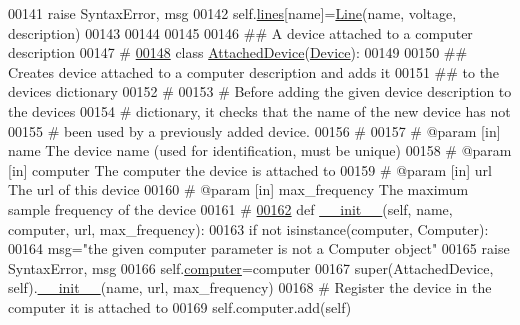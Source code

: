 \begin{DoxyCode}
00141             \textcolor{keywordflow}{raise} SyntaxError, msg
00142         self.\hyperlink{classsettings__classes_1_1_device_a22ea78f101680108434cb132f12afa0a}{lines}[name]=\hyperlink{classsettings__classes_1_1_line}{Line}(name, voltage, description)
00143 
00144 
00145 
00146 \textcolor{comment}{## A device attached to a computer description}
00147 \textcolor{comment}{#}
\hypertarget{settings__classes_8py_source_l00148}{}\hyperlink{classsettings__classes_1_1_attached_device}{00148} \textcolor{keyword}{class }\hyperlink{classsettings__classes_1_1_attached_device}{AttachedDevice}(\hyperlink{classsettings__classes_1_1_device}{Device}):
00149     
00150     \textcolor{comment}{## Creates device attached to a computer description and adds it}
00151     \textcolor{comment}{## to the devices dictionary}
00152     \textcolor{comment}{#}
00153     \textcolor{comment}{#  Before adding the given device description to the devices}
00154     \textcolor{comment}{#  dictionary, it checks that the name of the new device has not}
00155     \textcolor{comment}{#  been used by a previously added device.}
00156     \textcolor{comment}{#}
00157     \textcolor{comment}{# @param [in] name           The device name (used for identification, must
       be unique) }
00158     \textcolor{comment}{# @param [in] computer       The computer the device is attached to}
00159     \textcolor{comment}{# @param [in] url            The url of this device}
00160     \textcolor{comment}{# @param [in] max\_frequency  The maximum sample frequency of the device}
00161     \textcolor{comment}{#}
\hypertarget{settings__classes_8py_source_l00162}{}\hyperlink{classsettings__classes_1_1_attached_device_a98f8cb986fbbcd435b452dc91dc6e8c1}{00162}     \textcolor{keyword}{def }\hyperlink{classsettings__classes_1_1_attached_device_ac775ee34451fdfa742b318538164070e}{__init__}(self, name, computer, url, max\_frequency):
00163         \textcolor{keywordflow}{if} \textcolor{keywordflow}{not} isinstance(computer, Computer):
00164             msg=\textcolor{stringliteral}{"the given computer parameter is not a Computer object"}
00165             \textcolor{keywordflow}{raise} SyntaxError, msg
00166         self.\hyperlink{classsettings__classes_1_1_attached_device_a98f8cb986fbbcd435b452dc91dc6e8c1}{computer}=computer
00167         super(AttachedDevice, self).\hyperlink{classsettings__classes_1_1_attached_device_ac775ee34451fdfa742b318538164070e}{__init__}(name, url, max\_frequency)
00168         \textcolor{comment}{# Register the device in the computer it is attached to}
00169         self.computer.add(self)

\end{DoxyCode}
